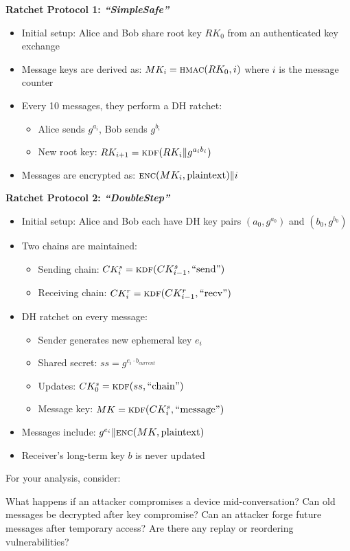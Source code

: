 \documentclass[10pt,a4paper,american]{exam}
\begin{document}
\begin{questions}
\begin{parts}
		\textbf{Ratchet Protocol 1: \textit{``SimpleSafe''}}
		\begin{itemize}
			\item Initial setup: Alice and Bob share root key $RK_0$ from an authenticated key exchange
			\item Message keys are derived as: $MK_i = \func{hmac}{RK_0, i}$ where $i$ is the message counter
			\item Every 10 messages, they perform a DH ratchet:
			      \begin{itemize}
				      \item Alice sends $g^{a_i}$, Bob sends $g^{b_i}$
				      \item New root key: $RK_{i+1} = \func{kdf}{RK_i \| g^{a_i b_i}}$
			      \end{itemize}
			\item Messages are encrypted as: $\func{enc}{MK_i, \text{plaintext}} \| i$
		\end{itemize}

		\textbf{Ratchet Protocol 2: \textit{``DoubleStep''}}
		\begin{itemize}
			\item Initial setup: Alice and Bob each have DH key pairs $(a_0, g^{a_0})$ and $(b_0, g^{b_0})$
			\item Two chains are maintained:
			      \begin{itemize}
				      \item Sending chain: $CK^s_i = \func{kdf}{CK^s_{i-1}, \text{``send''}}$
				      \item Receiving chain: $CK^r_i = \func{kdf}{CK^r_{i-1}, \text{``recv''}}$
			      \end{itemize}
			\item DH ratchet on every message:
			      \begin{itemize}
				      \item Sender generates new ephemeral key $e_i$
				      \item Shared secret: $ss = g^{e_i \cdot b_{current}}$
				      \item Updates: $CK^s_0 = \func{kdf}{ss, \text{``chain''}}$
				      \item Message key: $MK = \func{kdf}{CK^s_i, \text{``message''}}$
			      \end{itemize}
			\item Messages include: $g^{e_i} \| \func{enc}{MK, \text{plaintext}}$
			\item Receiver's long-term key $b$ is never updated
		\end{itemize}

		For your analysis, consider:
		\begin{subparts}
			\subpart What happens if an attacker compromises a device mid-conversation?
			\subpart Can old messages be decrypted after key compromise?
			\subpart Can an attacker forge future messages after temporary access?
			\subpart Are there any replay or reordering vulnerabilities?
		\end{subparts}
	\end{parts}
\end{questions}
\end{document}
